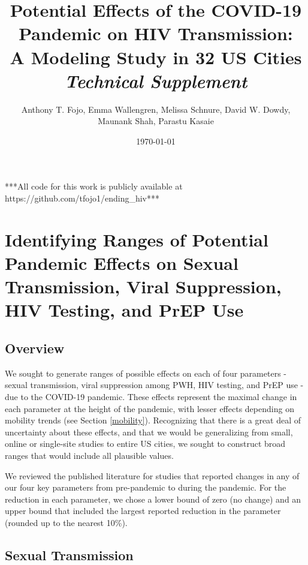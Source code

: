 \documentclass{article}
\begin{document}
	
\setcounter{tocdepth}{4} 
\setcounter{secnumdepth}{4}	
	
\title{Potential Effects of the COVID-19 Pandemic on HIV Transmission:\\ A Modeling Study in 32 US Cities\\
	\textit{Technical Supplement}}
\date{\today}
\author{Anthony T. Fojo, Emma Wallengren, Melissa Schnure, David W. Dowdy, Maunank Shah, Parastu Kasaie}

\maketitle
{}

\setcounter{tocdepth}{2}
\tableofcontents

\vfill
***All code for this work is publicly available at https://github.com/tfojo1/ending\_hiv***
\pagebreak


\section{Identifying Ranges of Potential Pandemic Effects on Sexual Transmission, Viral Suppression, HIV Testing, and PrEP Use}

\subsection{Overview}

We sought to generate ranges of possible effects on each of four parameters - sexual transmission, viral suppression among PWH, HIV testing, and PrEP use - due to the COVID-19 pandemic. These effects represent the maximal change in each parameter at the height of the pandemic, with lesser effects depending on mobility trends (see Section \ref{mobility}). Recognizing that there is a great deal of uncertainty about these effects, and that we would be generalizing from small, online or single-site studies to entire US cities, we sought to construct broad ranges that would include all plausible values.

We reviewed the published literature for studies that reported changes in any of our four key parameters from pre-pandemic to during the pandemic. For the reduction in each parameter, we chose a lower bound of zero (no change) and an upper bound that included the largest reported reduction in the parameter (rounded up to the nearest 10\%).

\subsection{Sexual Transmission}
\end{document}
